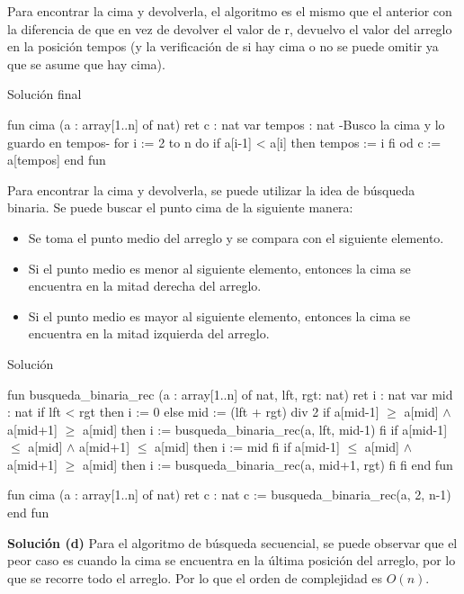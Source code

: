 Para encontrar la cima y devolverla, el algoritmo es el mismo que el anterior con la diferencia de que en vez de devolver el valor de r, devuelvo el valor del arreglo en la posición tempos (y la verificación de si hay cima o no se puede omitir ya que se asume que hay cima).

\begin{codebox}{Solución final}
\begin{pascallike}
fun cima (a : array[1..n] of nat) ret c : nat
    var tempos : nat
    {-Busco la cima y lo guardo en tempos-}
    for i := 2 to n do
        if a[i-1] < a[i] then
            tempos := i
        fi
    od
    c := a[tempos]
end fun
\end{pascallike}
\end{codebox}

Para encontrar la cima y devolverla, se puede utilizar la idea de búsqueda binaria. Se puede buscar el punto cima de la siguiente manera:

\begin{itemize}
    \item Se toma el punto medio del arreglo y se compara con el siguiente elemento.
    \item Si el punto medio es menor al siguiente elemento, entonces la cima se encuentra en la mitad derecha del arreglo.
    \item Si el punto medio es mayor al siguiente elemento, entonces la cima se encuentra en la mitad izquierda del arreglo.
\end{itemize}

\begin{codebox}{Solución}
\begin{pascallike}
fun busqueda_binaria_rec (a : array[1..n] of nat, lft, rgt: nat) ret i : nat
var mid : nat
if lft < rgt then
    i := 0
else
    mid := (lft + rgt) div 2
    if a[mid-1] $\geq$ a[mid] $\wedge$ a[mid+1] $\geq$ a[mid] then
        i := busqueda_binaria_rec(a, lft, mid-1)
    fi
    if a[mid-1] $\leq$ a[mid] $\wedge$ a[mid+1] $\leq$ a[mid] then
        i := mid
    fi
    if a[mid-1] $\leq$ a[mid] $\wedge$ a[mid+1] $\geq$ a[mid] then
        i := busqueda_binaria_rec(a, mid+1, rgt)
    fi
fi
end fun

fun cima (a : array[1..n] of nat) ret c : nat
    c := busqueda_binaria_rec(a, 2, n-1)
end fun
\end{pascallike}
\end{codebox}

\textbf{Solución (d)}
Para el algoritmo de búsqueda secuencial, se puede observar que el peor caso es cuando la cima se encuentra en la última posición del arreglo, por lo que se recorre todo el arreglo. Por lo que el orden de complejidad es $O(n)$.

